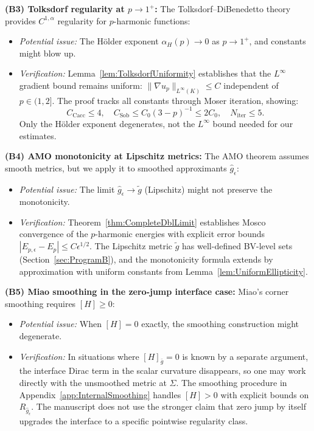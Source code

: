 \begin{remark}
\textbf{(B3) Tolksdorf regularity at $p \to 1^+$:}
The Tolksdorf--DiBenedetto theory \cite{tolksdorf1984,dibenedetto1983} provides $C^{1,\alpha}$ regularity for $p$-harmonic functions:
\begin{itemize}
    \item \textit{Potential issue:} The H\"older exponent $\alpha_H(p) \to 0$ as $p \to 1^+$, and constants might blow up.
    \item \textit{Verification:} Lemma~\ref{lem:TolksdorfUniformity} establishes that the $L^\infty$ gradient bound remains uniform: $\|\nabla u_p\|_{L^\infty(K)} \le C$ independent of $p \in (1,2]$. The proof tracks all constants through Moser iteration, showing:
    \[
    C_{\text{Cacc}} \le 4, \quad C_{\text{Sob}} \le C_0(3-p)^{-1} \le 2C_0, \quad N_{\text{iter}} \le 5.
    \]
    Only the H\"older exponent degenerates, not the $L^\infty$ bound needed for our estimates.
\end{itemize}

\textbf{(B4) AMO monotonicity at Lipschitz metrics:}
The AMO theorem \cite{amo2024} assumes smooth metrics, but we apply it to smoothed approximants $\hat{g}_\epsilon$:
\begin{itemize}
    \item \textit{Potential issue:} The limit $\hat{g}_\epsilon \to \tilde{g}$ (Lipschitz) might not preserve the monotonicity.
    \item \textit{Verification:} Theorem~\ref{thm:CompleteDblLimit} establishes Mosco convergence of the $p$-harmonic energies with explicit error bounds $|E_{p,\epsilon} - E_p| \le C\epsilon^{1/2}$. The Lipschitz metric $\tilde{g}$ has well-defined BV-level sets (Section~\ref{sec:ProgramB}), and the monotonicity formula extends by approximation with uniform constants from Lemma~\ref{lem:UniformEllipticity}.
\end{itemize}

\textbf{(B5) Miao smoothing in the zero-jump interface case:}
Miao's corner smoothing \cite{miao2002} requires $[H] \ge 0$:
\begin{itemize}
    \item \textit{Potential issue:} When $[H] = 0$ exactly, the smoothing construction might degenerate.
    \item \textit{Verification:} In situations where $[H]_{\bar{g}} = 0$ is known by a separate argument, the interface Dirac term in the scalar curvature disappears, so one may work directly with the unsmoothed metric at $\Sigma$. The smoothing procedure in Appendix~\ref{app:InternalSmoothing} handles $[H] > 0$ with explicit bounds on $R_{\hat{g}_\epsilon}$. The manuscript does not use the stronger claim that zero jump by itself upgrades the interface to a specific pointwise regularity class.
\end{itemize}


\end{remark}
